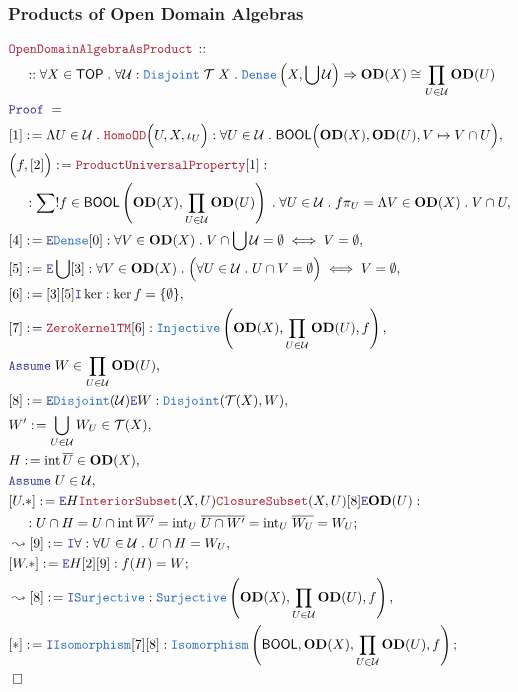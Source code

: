 \documentclass[12pt]{scrartcl}
\newcommand{\TYPE}[1]{\textcolor{NavyBlue}{\mathtt{#1}}}
\newcommand{\LOGIC}[1]{\textcolor{Blue}{\mathtt{#1}}}
\newcommand{\THM}[1]{\textcolor{Maroon}{\mathtt{#1}}}
\renewcommand{\.}{\; . \;}
\newcommand{\de}{: \kern 0.1pc =}
\newcommand{\Theorem}[2]{& \THM{#1} \, :: \, #2 \\ & \Proof = \\ }
\newcommand{\NewLine}{\\ & \kern 1pc}
\newcommand{\Page}[1]{ \begin{align*} #1 \end{align*}   }
\newcommand{\Imply}{\Rightarrow}
\newcommand{\Intro}{\LOGIC{I}}
\newcommand{\Elim}{\LOGIC{E}}
\newcommand{\Surj}{\TYPE{Surjective}}
\newcommand{\Inj}{\TYPE{Injective}}
\newcommand{\Say}[3]{& #1 \de #2 : #3, \\}
\newcommand{\SayIn}[3]{& #1 \de #2 \in #3, \\}
\newcommand{\Conclude}[3]{& #1 \de #2 : #3; \\}
\newcommand{\Derive}[3]{& \leadsto #1 \de #2 : #3, \\}
\newcommand{\AssumeIn}[2]{& \LOGIC{Assume} \; #1 \in #2, \\}
\newcommand{\QED}{\; \square}
\newcommand{\EndProof}{& \QED \\}
\newcommand{\Proof}{\LOGIC{Proof} \; }
\newcommand{\Dense}{\TYPE{Dense}}
\DeclareMathOperator*{\intx}{int}
\newcommand{\TOP}{\mathsf{TOP}}
\newcommand{\T}{\mathcal{T}}
\newcommand{\U}{\mathcal{U}}
\newcommand{\od}{\mathbf{OD}}
\newcommand{\BOOL}{\mathsf{BOOL}}
\begin{document}
\subsubsection{Products of Open Domain Algebras}
\Page{
	\Theorem{OpenDomainAlgebraAsProduct}
	{
		\NewLine ::		
		\forall X \in \TOP \.
		\forall \U : \TYPE{Disjoint}\;\T\;X \.
		\Dense\left(X, \bigcup \U \right) \Imply
		\od(X) \cong \prod_{U \in \U} \od(U)
	}
	\Say{[1]}{\Lambda U \in \U \. \THM{HomoOD}\Big(U,X,\iota_U \Big)  }
	{
		\forall U \in \U \. \BOOL\Big( \od(X),\od(U), V \mapsto V \cap U \Big)
	}
	\Say{\Big(f,[2]\Big)}{\THM{ProductUniversalProperty}[1]}
	{
		\NewLine :		
		\sum! f \in \BOOL\left(\od(X), \prod_{U \in \U} \od(U) \right) \. 
		\forall U \in \U \. f\pi_U = \Lambda V \in \od(X) \.  V \cap U
	}
	\Say{[4]}{\Elim \Dense[0]}
	{
		\forall V \in \od(X) \.
		V \cap \bigcup \U = \emptyset
		\iff
		V = \emptyset
	}
	\Say{[5]}{\Elim \bigcup [3]}
	{
		\forall V \in \od(X) \.
		\Big( \forall U \in \U \. U \cap V = \emptyset \Big)
		\iff
		V = \emptyset
	}
	\Say{[6]}{[3][5]\Intro \ker}{\ker f = \{ \emptyset \}}
	\Say{[7]}{\THM{ZeroKernelTM}[6]}{\Inj\left(\od(X),\prod_{U \in \U}\od(U),f\right)}
	\AssumeIn{W}{\prod_{U \in \U} \od(U)}
	\Say{[8]}{\Elim \TYPE{Disjoint}(\U)\Elim W}
	{
		\TYPE{Disjoint}( \T(X), W )	
	}
	\SayIn{W'}{\bigcup_{U \in \U} W_U}{\T(X)}
	\SayIn{H}{\intx \overline{U}}{\od(X)}
	\AssumeIn{U}{\U}
	\Conclude{[U.*]}{
		\Elim H 
		\THM{InteriorSubset}(X,U)\THM{ClosureSubset}(X,U)
		[8] 
		\Elim \od(U) 
	}
	{
			\NewLine :			
			U \cap H =
			U \cap \intx \overline{W'} =
			{\intx}_U \; \overline{U \cap W'} =
			{\intx}_U \; \overline{W_U} =
			W_U
	}
	\Derive{[9]}{\Intro \forall}{\forall U \in \U \. U \cap H = W_U}
	\Conclude{[W.*]}{\Elim H [2][9]}
	{
			f(H) = W  
	}
	\Derive{[8]}{\Intro \Surj}{\Surj\left( \od(X), \prod_{U \in \U} \od(U),f \right)}
	\Conclude{[*]}{\Intro \TYPE{Isomorphism}[7][8]}
	{
		\TYPE{Isomorphism}\left( \BOOL, \od(X),\prod_{U \in \U} \od(U), f \right)
	}
	\EndProof
}
\newpage
\end{document}
